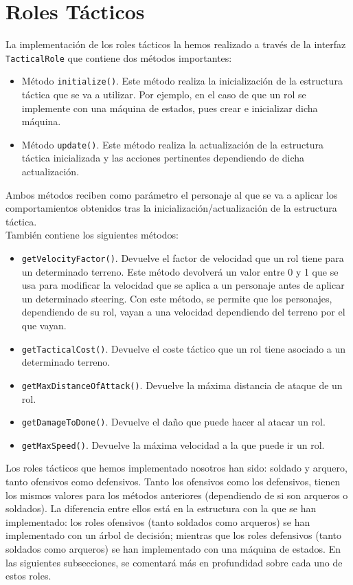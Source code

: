 \medskip
\section{Roles Tácticos}
\label{roles}
La implementación de los roles tácticos la hemos realizado a través de la interfaz \texttt{TacticalRole} que contiene dos métodos importantes:
\begin{itemize}
 \item Método \texttt{initialize()}. Este método realiza la inicialización de la estructura táctica que se va a utilizar. Por ejemplo, en el caso de que un rol se implemente con una máquina de estados, pues crear e inicializar dicha máquina.
 \item Método \texttt{update()}. Este método realiza la actualización de la estructura táctica inicializada y las acciones pertinentes dependiendo de dicha actualización.
\end{itemize}

Ambos métodos reciben como parámetro el personaje al que se va a aplicar los comportamientos obtenidos tras la inicialización/actualización de la estructura táctica. \\

También contiene los siguientes métodos:
\begin{itemize}
 \item \texttt{getVelocityFactor()}. Devuelve el factor de velocidad que un rol tiene para un determinado terreno. Este método devolverá un valor entre 0 y 1 que se usa para modificar la velocidad que se aplica a un personaje antes de aplicar un determinado steering. Con este método, se permite que los personajes, dependiendo de su rol, vayan a una velocidad dependiendo del terreno por el que vayan.
 \item \texttt{getTacticalCost()}. Devuelve el coste táctico que un rol tiene asociado a un determinado terreno. 
 \item \texttt{getMaxDistanceOfAttack()}. Devuelve la máxima distancia de ataque de un rol.
 \item \texttt{getDamageToDone()}. Devuelve el daño que puede hacer al atacar un rol.
 \item \texttt{getMaxSpeed()}. Devuelve la máxima velocidad a la que puede ir un rol.
\end{itemize}

Los roles tácticos que hemos implementado nosotros han sido: soldado y arquero, tanto ofensivos como defensivos. Tanto los ofensivos como los defensivos, tienen los mismos valores para los métodos anteriores (dependiendo de si son arqueros o soldados). La diferencia entre ellos está en la estructura con la que se han implementado: los roles ofensivos (tanto soldados como arqueros) se han implementado con un árbol de decisión; mientras que los roles defensivos (tanto soldados como arqueros) se han implementado con una máquina de estados. En las siguientes subsecciones, se comentará más en profundidad sobre cada uno de estos roles. \\

